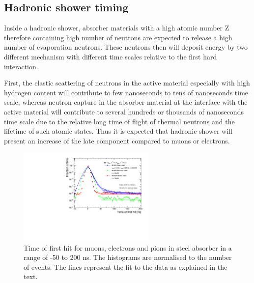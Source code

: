 \subsection{Hadronic shower timing}

Inside a hadronic shower, absorber materials with a high atomic number Z therefore containing high number of neutrons are expected to release a high number of evaporation neutrons. These neutrons then will deposit energy by two different mechanism with different time scales relative to the first hard interaction.

First, the elastic scattering of neutrons in the active material especially with high hydrogen content will contribute to few nanoseconds to tens of nanoseconds time scale, whereas neutron capture in the absorber material at the interface with the active material will contribute to several hundreds or thousands of nanoseconds time scale due to the relative long time of flight of thermal neutrons and the lifetime of such atomic states. Thus it is expected that hadronic shower will present an increase of the late component compared to muons or electrons.

\begin{figure}[htbp!]
	\centering
	\includegraphics[width=0.6\textwidth]{chap5/fig_AHCAL_timing/Pions/Timing_dNdt_Comparison.pdf}
	\caption{Time of first hit for muons, electrons and pions in steel absorber in a range of -50 to 200 ns. The histograms are normalised to the number of events. The lines represent the fit to the data as explained in the text.}
	\label{fig:dNdt_Comparison}
\end{figure}

